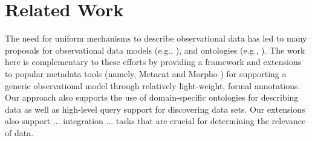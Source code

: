 
\section{Related Work}
\label{sec:related}

The need for uniform mechanisms to describe observational data has led
to many proposals for observational data models (e.g., \cite{om,
  tarboton07:_cuahs_commun_obser_data_model,netcdf}), and ontologies
(e.g.,
\cite{fox09:_ontol,sweet,sheth08:_seman_sensor_web,mungall110:_integ}).
The work here is complementary to these efforts by providing a
framework and extensions to popular metadata tools (namely, Metacat
\cite{} and Morpho \cite{}) for supporting a generic observational
model through relatively light-weight, formal annotations. Our
approach also supports the use of domain-specific ontologies for
describing data as well as high-level query support for discovering
data sets. Our extensions also support ... integration ... tasks that
are crucial for determining the relevance of data.

